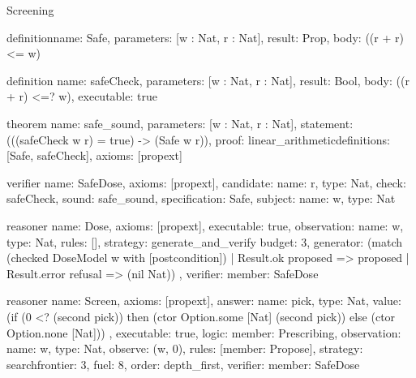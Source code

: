 \begin{lexlean}{Screening}
\begin{semanticmodule}
definition{name: Safe, parameters: [w : Nat, r : Nat], result: Prop, body: ((r + r) <= w)}

definition{
  name: safeCheck,
  parameters: [w : Nat, r : Nat],
  result: Bool,
  body: ((r + r) <=? w),
  executable: true
}

theorem{
  name: safe_sound,
  parameters: [w : Nat, r : Nat],
  statement: (((safeCheck w r) = true) -> (Safe w r)),
  proof: linear_arithmetic{definitions: [Safe, safeCheck]},
  axioms: [propext]
}

verifier{
  name: SafeDose,
  axioms: [propext],
  candidate: {name: r, type: Nat},
  check: safeCheck,
  sound: safe_sound,
  specification: Safe,
  subject: {name: w, type: Nat}
}

reasoner{
  name: Dose,
  axioms: [propext],
  executable: true,
  observation: {name: w, type: Nat},
  rules: [],
  strategy: generate_and_verify{
    budget: 3,
    generator: (match (checked DoseModel w with [postcondition])
      | Result.ok proposed => proposed
      | Result.error refusal => (nil Nat))
  },
  verifier: {member: SafeDose}
}

reasoner{
  name: Screen,
  axioms: [propext],
  answer: {
    name: pick,
    type: Nat,
    value: (if (0 <? (second pick)) then (ctor Option.some [Nat] (second pick)) else (ctor Option.none [Nat]))
  },
  executable: true,
  logic: {member: Prescribing},
  observation: {name: w, type: Nat},
  observe: (w, 0),
  rules: [{member: Propose}],
  strategy: search{frontier: 3, fuel: 8, order: depth_first},
  verifier: {member: SafeDose}
}
\end{semanticmodule}
\end{lexlean}
